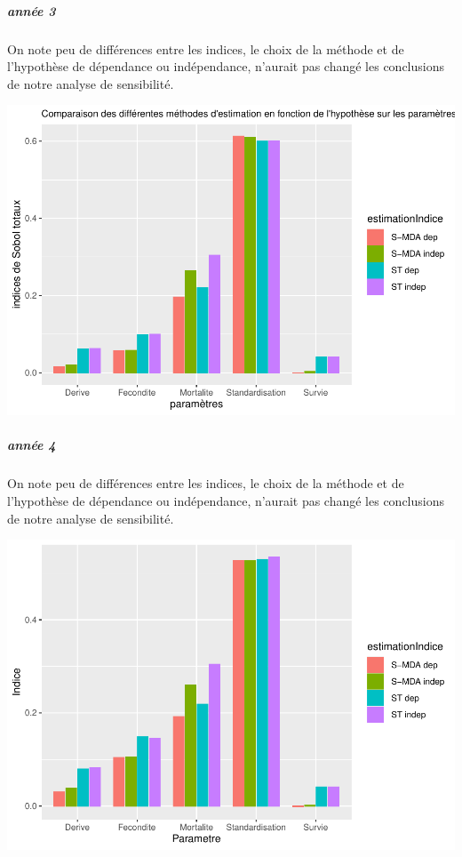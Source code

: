 \documentclass[
]{article}
\begin{document}
\hypertarget{annuxe9e-3-1}{%
\subparagraph{année 3}\label{annuxe9e-3-1}}

On note peu de différences entre les indices, le choix de la méthode et
de l'hypothèse de dépendance ou indépendance, n'aurait pas changé les
conclusions de notre analyse de sensibilité.

\includegraphics{rapport_files/figure-latex/eprtygssf-1.pdf}

\hypertarget{annuxe9e-4-1}{%
\subparagraph{année 4}\label{annuxe9e-4-1}}

On note peu de différences entre les indices, le choix de la méthode et
de l'hypothèse de dépendance ou indépendance, n'aurait pas changé les
conclusions de notre analyse de sensibilité.

\includegraphics{rapport_files/figure-latex/zvh-1.pdf}
\end{document}
